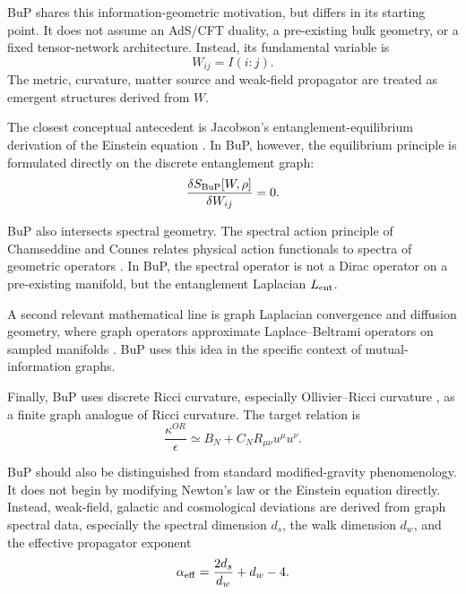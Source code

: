 \documentclass[11pt,a4paper]{article}
\begin{document}
BuP shares this information-geometric motivation, but differs in its starting
point. It does not assume an AdS/CFT duality, a pre-existing bulk geometry, or
a fixed tensor-network architecture. Instead, its fundamental variable is
\begin{equation}
  W_{ij}=I(i:j).
\end{equation}
The metric, curvature, matter source and weak-field propagator are treated as
emergent structures derived from \(W\).

The closest conceptual antecedent is Jacobson's entanglement-equilibrium
derivation of the Einstein equation \cite{Jacobson2015}. In BuP, however, the
equilibrium principle is formulated directly on the discrete entanglement graph:
\begin{equation}
  \frac{\delta S_{\rm BuP}[W,\rho]}{\delta W_{ij}}=0.
\end{equation}

BuP also intersects spectral geometry. The spectral action principle of
Chamseddine and Connes relates physical action functionals to spectra of
geometric operators \cite{ChamseddineConnes1996}. In BuP, the spectral operator
is not a Dirac operator on a pre-existing manifold, but the entanglement
Laplacian \(L_{\rm ent}\).

A second relevant mathematical line is graph Laplacian convergence and
diffusion geometry, where graph operators approximate Laplace--Beltrami
operators on sampled manifolds \cite{CoifmanLafon2006}. BuP uses this idea in
the specific context of mutual-information graphs.

Finally, BuP uses discrete Ricci curvature, especially Ollivier--Ricci
curvature \cite{Ollivier2009}, as a finite graph analogue of Ricci curvature.
The target relation is
\begin{equation}
  \frac{\kappa^{OR}}{\epsilon}
  \simeq
  B_N+C_N R_{\mu\nu}u^\mu u^\nu.
\end{equation}

BuP should also be distinguished from standard modified-gravity phenomenology.
It does not begin by modifying Newton's law or the Einstein equation directly.
Instead, weak-field, galactic and cosmological deviations are derived from graph
spectral data, especially the spectral dimension \(d_s\), the walk dimension
\(d_w\), and the effective propagator exponent
\begin{equation}
  \alpha_{\rm eff}
  =
  \frac{2d_s}{d_w}
  +
  d_w
  -
  4.
\end{equation}
\end{document}
